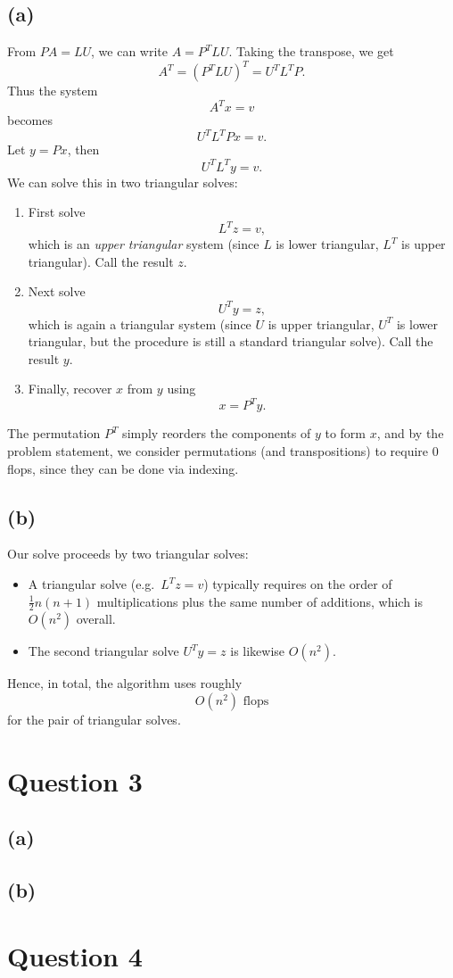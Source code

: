 \documentclass{article}
\begin{document}
\subsection*{(a)}
From $PA = LU$, we can write $A = P^T LU$. Taking the transpose, we get
$$
    A^T = (P^T LU)^T = U^TL^TP.
$$
Thus the system
$$
    A^T x = v
$$
becomes
$$
    U^T  L^T  P  x = v.
$$
Let $y = Px$, then
$$
    U^T  L^T  y = v.
$$
We can solve this in two triangular solves:
\begin{enumerate}
    \item First solve
          $$
              L^Tz = v,
          $$
          which is an \emph{upper triangular} system (since $L$ is lower triangular, $L^T$ is upper triangular). Call the result $z$.
    \item Next solve
          $$
              U^Ty = z,
          $$
          which is again a triangular system (since $U$ is upper triangular, $U^T$ is lower triangular, but the procedure is still a standard triangular solve). Call the result $y$.
    \item Finally, recover $x$ from $y$ using
          $$
              x = P^T  y.
          $$
\end{enumerate}
The permutation $P^T$ simply reorders the components of $y$ to form $x$, and by the problem statement, we consider permutations (and transpositions) to require 0 flops, since they can be done via indexing.

\subsection*{(b)}
Our solve proceeds by two triangular solves:
\begin{itemize}
    \item A triangular solve (e.g.\ $L^T z = v$) typically requires on the order of $\tfrac12n(n+1)$ multiplications plus the same number of additions, which is $O(n^2)$ overall.
    \item The second triangular solve $U^T y = z$ is likewise $O(n^2)$.
\end{itemize}

Hence, in total, the algorithm uses roughly
$$
    \boxed{O(n^2) \text{ flops}}
$$
for the pair of triangular solves.

\newpage
\section*{Question 3}
\subsection*{(a)}


\subsection*{(b)}

\newpage
\section*{Question 4}
\end{document}
